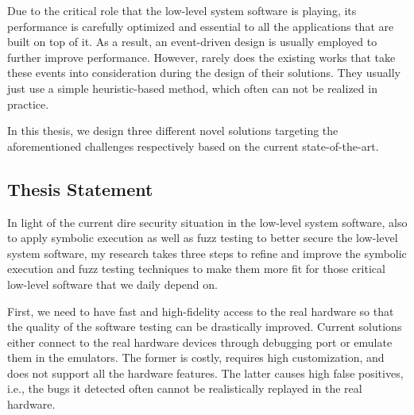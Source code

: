 Due to the critical role that the low-level system software is playing, its performance is carefully optimized and essential to all the applications that are built on top of it. 
As a result, an event-driven design is usually employed to further improve performance. 
However, rarely does the existing works that take these events into consideration during the design of their solutions. 
They usually just use a simple heuristic-based method, which often can not be realized in practice.



In this thesis, we design three different novel solutions targeting the aforementioned challenges respectively based on the current state-of-the-art. 

\subsection{Thesis Statement}

In light of the current dire security situation in the low-level system software, also to apply symbolic execution as well as fuzz testing to better secure the low-level system software, 
my research takes three steps to refine and improve the symbolic execution and fuzz testing techniques to make them more fit for those critical low-level software that we daily depend on.

First, we need to have fast and high-fidelity access to the real hardware so that the quality of the software testing can be drastically improved. 
Current solutions either connect to the real hardware devices through debugging port or emulate them in the emulators. 
The former is costly, requires high customization, and does not support all the hardware features. 
The latter causes high false positives, i.e., the bugs it detected often cannot be realistically replayed in the real hardware.

